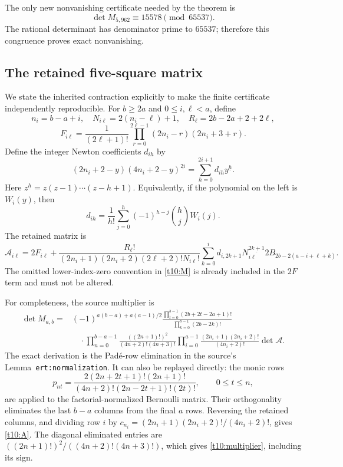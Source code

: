 The only new nonvanishing certificate needed by the theorem is
\begin{equation}\label{t10:main-certificate}
 \boxed{\det M_{5,962}\equiv15578\pmod{65537}.}
\end{equation}
The rational determinant has denominator prime to $65537$;
therefore this congruence proves exact nonvanishing.

\subsection{The retained five-square matrix}

We state the inherited contraction explicitly to make the finite
certificate independently reproducible. For $b\ge2a$ and
$0\le i,\ell<a$, define
\[
 n_i=b-a+i,\quad N_{i\ell}=2(n_i-\ell)+1,\quad
 R_\ell=2b-2a+2+2\ell,
\]
\[
 F_{i\ell}=\frac1{(2\ell+1)!}
 \prod_{r=0}^{2\ell-1}(2n_i-r)(2n_i+3+r).
\]
Define the integer Newton coefficients $d_{ih}$ by
\begin{equation}\label{t10:Newton}
 (2n_i+2-y)(4n_i+2-y)^{\underline{2i}}
       =\sum_{h=0}^{2i+1}d_{ih}y^{\underline h}.
\end{equation}
Here $z^{\underline h}=z(z-1)\cdots(z-h+1)$. Equivalently,
if the polynomial on the left is $W_i(y)$, then
\[
 d_{ih}=\frac1{h!}\sum_{j=0}^h(-1)^{h-j}\binom hj W_i(j).
\]
The retained matrix is
\begin{equation}\label{t10:A}
 \mathcal A_{i\ell}=2F_{i\ell}
 +\frac{R_\ell!}
 {(2n_i+1)(2n_i+2)(2\ell+2)!N_{i\ell}!}
 \sum_{k=0}^i d_{i,2k+1}N_{i\ell}^{\underline{2k+1}}
                 2B_{2b-2(a-i+\ell+k)}.
\end{equation}
The omitted lower-index-zero convention in \eqref{t10:M} is
already included in the $2F$ term and must not be altered.

For completeness, the source multiplier is
\begin{equation}\label{t10:multiplier}
 \begin{aligned}
 \det M_{a,b}={}&(-1)^{a(b-a)+a(a-1)/2}
 \frac{\prod_{t=0}^{b-1}(2b+2t-2a+1)!}
      {\prod_{k=0}^{b-1}(2b-2k)!}\\
 &\quad\cdot\prod_{n=0}^{b-a-1}\frac{((2n+1)!)^2}{(4n+2)!(4n+3)!}
 \prod_{i=0}^{a-1}\frac{(2n_i+1)(2n_i+2)!}{(4n_i+2)!}
 \det\mathcal A.
 \end{aligned}
\end{equation}
The exact derivation is the Pad\'e-row elimination in the source's
Lemma~\texttt{ert:normalization}. It can also be replayed directly:
the monic rows
\[
 p_{nt}=\frac{2(2n+2t+1)!(2n+1)!}
 {(4n+2)!(2n-2t+1)!(2t)!},\qquad0\le t\le n,
\]
are applied to the factorial-normalized Bernoulli matrix. Their
orthogonality eliminates the last $b-a$ columns from the final $a$
rows. Reversing the retained columns, and dividing row $i$ by
$c_{n_i}=(2n_i+1)(2n_i+2)!/(4n_i+2)!$, gives \eqref{t10:A}.
The diagonal eliminated entries are
$((2n+1)!)^2/((4n+2)!(4n+3)!)$, which gives
\eqref{t10:multiplier}, including its sign.

